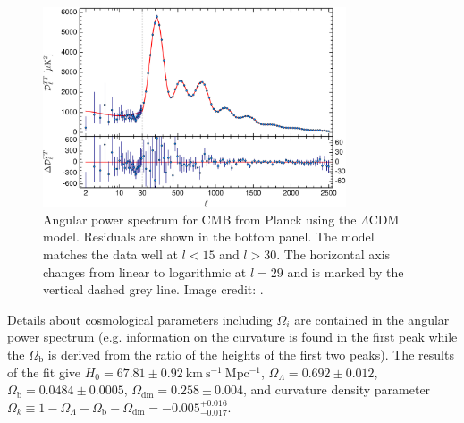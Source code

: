 \begin{figure}
	\includegraphics[width=0.8\textwidth]{cmb_power_spectrum}
	\centering
	\caption[Angular power spectrum for CMB from Planck using the $\Lambda$CDM model.]{Angular power spectrum for CMB from Planck using the
	$\Lambda$CDM model.  Residuals
	are shown in the bottom panel.  The model matches the data well at $l < 15$ and $l > 30$.  The horizontal axis changes from linear to
	logarithmic at $l = 29$ and is marked by the vertical dashed grey
	line. Image credit: .}
	\label{fig:cmb_power_spectrum}
\end{figure}

Details about cosmological parameters including $\Omega_i$ are contained in the angular power spectrum (e.g. information on the curvature
is found in the first peak while the $\Omega_{\mathrm{b}}$ is derived from the ratio of the heights of the first two peaks).  The results
of the fit give $H_{0} = 67.81 \pm 0.92\ \mathrm{km\ s^{-1}\ Mpc^{-1}}$, $\Omega_{\Lambda} = 0.692 \pm 0.012$,
$\Omega_{\mathrm{b}} = 0.0484 \pm 0.0005$, $\Omega_{\mathrm{dm}} = 0.258 \pm 0.004$, and curvature density parameter
$\Omega_{k} \equiv 1 - \Omega_{\Lambda} - \Omega_{\mathrm{b}} - \Omega_{\mathrm{dm}} =  -0.005_{-0.017}^{+0.016}$.







